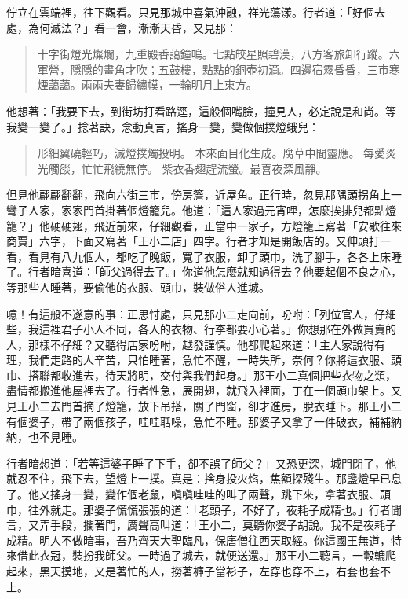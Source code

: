 佇立在雲端裡，往下觀看。只見那城中喜氣沖融，祥光蕩漾。行者道：「好個去處，為何滅法？」看一會，漸漸天昏，又見那：
\begin{quote}
十字街燈光燦爛，九重殿香藹鐘鳴。七點皎星照碧漢，八方客旅卸行蹤。六軍營，隱隱的畫角才吹；五鼓樓，點點的銅壺初滴。四邊宿霧昏昏，三市寒煙藹藹。兩兩夫妻歸繡幙，一輪明月上東方。
\end{quote}

他想著：「我要下去，到街坊打看路逕，這般個嘴臉，撞見人，必定說是和尚。等我變一變了。」捻著訣，念動真言，搖身一變，變做個撲燈蛾兒：
\begin{quote}
形細翼磽輕巧，滅燈撲燭投明。
本來面目化生成。腐草中間靈應。
每愛炎光觸燄，忙忙飛繞無停。
紫衣香翅趕流螢。最喜夜深風靜。
\end{quote}

但見他翩翩翻翻，飛向六街三市，傍房簷，近屋角。正行時，忽見那隅頭拐角上一彎子人家，家家門首掛著個燈籠兒。他道：「這人家過元宵哩，怎麼挨排兒都點燈籠？」他硬硬翅，飛近前來，仔細觀看，正當中一家子，方燈籠上寫著「安歇往來商賈」六字，下面又寫著「王小二店」四字。行者才知是開飯店的。又伸頭打一看，看見有八九個人，都吃了晚飯，寬了衣服，卸了頭巾，洗了腳手，各各上床睡了。行者暗喜道：「師父過得去了。」你道他怎麼就知過得去？他要起個不良之心，等那些人睡著，要偷他的衣服、頭巾，裝做俗人進城。

噫！有這般不遂意的事：正思忖處，只見那小二走向前，吩咐：「列位官人，仔細些，我這裡君子小人不同，各人的衣物、行李都要小心著。」你想那在外做買賣的人，那樣不仔細？又聽得店家吩咐，越發謹慎。他都爬起來道：「主人家說得有理，我們走路的人辛苦，只怕睡著，急忙不醒，一時失所，奈何？你將這衣服、頭巾、搭聯都收進去，待天將明，交付與我們起身。」那王小二真個把些衣物之類，盡情都搬進他屋裡去了。行者性急，展開翅，就飛入裡面，丁在一個頭巾架上。又見王小二去門首摘了燈籠，放下吊搭，關了門窗，卻才進房，脫衣睡下。那王小二有個婆子，帶了兩個孩子，哇哇聒噪，急忙不睡。那婆子又拿了一件破衣，補補納納，也不見睡。

行者暗想道：「若等這婆子睡了下手，卻不誤了師父？」又恐更深，城門閉了，他就忍不住，飛下去，望燈上一撲。真是：捨身投火焰，焦額探殘生。那盞燈早已息了。他又搖身一變，變作個老鼠，嗔嗔哇哇的叫了兩聲，跳下來，拿著衣服、頭巾，往外就走。那婆子慌慌張張的道：「老頭子，不好了，夜耗子成精也。」行者聞言，又弄手段，攔著門，厲聲高叫道：「王小二，莫聽你婆子胡說。我不是夜耗子成精。明人不做暗事，吾乃齊天大聖臨凡，保唐僧往西天取經。你這國王無道，特來借此衣冠，裝扮我師父。一時過了城去，就便送還。」那王小二聽言，一轂轆爬起來，黑天摸地，又是著忙的人，撈著褲子當衫子，左穿也穿不上，右套也套不上。

